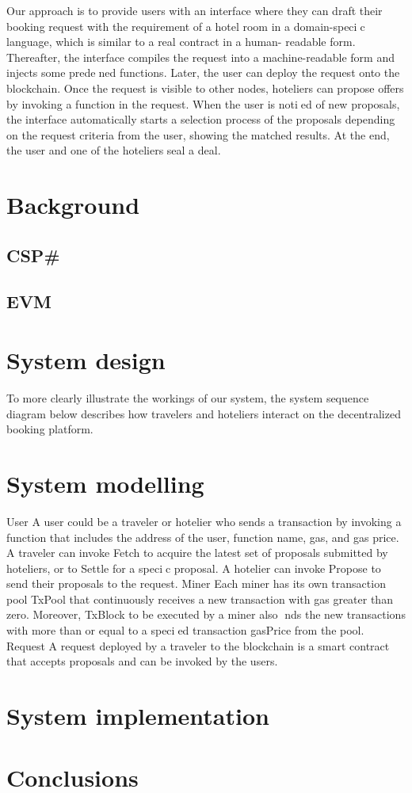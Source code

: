 \documentclass{KERauth}
\begin{document}
Our approach is to provide users with an interface where they can draft their booking request with the
requirement of a hotel room in a domain-specic language, which is similar to a real contract in a human-
readable form. Thereafter, the interface compiles the request into a machine-readable form and injects some
predened functions. Later, the user can deploy the request onto the blockchain. Once the request is visible
to other nodes, hoteliers can propose offers by invoking a function in the request. When the user is notied
of new proposals, the interface automatically starts a selection process of the proposals depending on the
request criteria from the user, showing the matched results. At the end, the user and one of the hoteliers seal
a deal.

\section{Background}

\subsection{CSP\#}

\subsection{EVM}

\section{System design}
To more clearly illustrate the workings of our system, the system sequence diagram below describes
how travelers and hoteliers interact on the decentralized booking platform.

\section{System modelling}
User A user could be a traveler or hotelier who sends a transaction by invoking a function that includes
the address of the user, function name, gas, and gas price. A traveler can invoke Fetch to acquire the latest
set of proposals submitted by hoteliers, or to Settle for a specic proposal. A hotelier can invoke Propose
to send their proposals to the request.
Miner Each miner has its own transaction pool TxPool that continuously receives a new transaction with
gas greater than zero. Moreover, TxBlock to be executed by a miner also nds the new transactions with
more than or equal to a specied transaction gasPrice from the pool.
Request A request deployed by a traveler to the blockchain is a smart contract that accepts proposals
and can be invoked by the users.

\section{System implementation}

\section{Conclusions}
\end{document}
